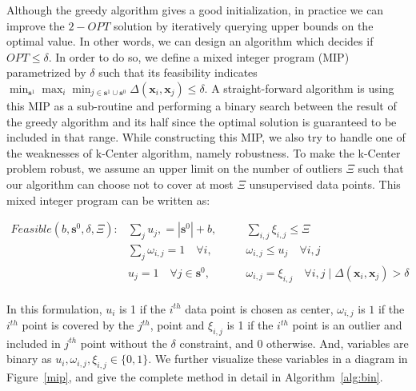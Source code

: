 \documentclass{article}
\begin{document}
Although the greedy algorithm gives a good initialization, in practice we can improve the $2-OPT$ solution by iteratively querying upper bounds on the optimal value. In other words, we can design an algorithm which decides if $OPT \leq \delta$. In order to do so, we define a mixed integer program (MIP) parametrized by $\delta$ such that its feasibility indicates $\min_{\mathbf{s}^1} \max_i \min_{j \in \mathbf{s}^1 \cup \mathbf{s}^0} \Delta(\mathbf{x}_i,\mathbf{x}_j) \leq \delta$. A straight-forward algorithm is using this MIP as a sub-routine and performing a binary search between the result of the greedy algorithm and its half since the optimal solution is guaranteed to be included in that range. While constructing this MIP, we also try to handle one of the weaknesses of k-Center algorithm, namely robustness. To make the k-Center problem robust, we assume an upper limit on the number of outliers $\Xi$ such that our algorithm can choose not to cover at most $\Xi$ unsupervised data points. This mixed integer program can be written as:

\begin{equation}
\begin{aligned}
Feasible(b,\mathbf{s}^0,\delta, \Xi):  &\sum_j  u_j, = |\mathbf{s}^0|+ b,  \quad &&  \sum_{i,j} \xi_{i,j} \leq \Xi \\
&\sum_j \omega_{i,j} = 1\quad \forall  i, \quad && \omega_{i,j} \leq u_j \quad \forall  i,j \\
   & u_j =1 \quad \forall j\in \mathbf{s}^0, \quad && \omega_{i,j} = \xi_{i,j} \quad  \forall i,j \mid   \Delta(\mathbf{x}_i,\mathbf{x}_j)  > \delta\\
\end{aligned}
\label{mipfeasible}
\end{equation}

In this formulation, $u_i$ is 1 if the $i^{th}$ data point is chosen as center, $\omega_{i,j}$ is $1$ if the $i^{th}$ point is covered by the $j^{th}$, point and $\xi_{i,j}$ is 1 if the $i^{th}$ point is an outlier and included in $j^{th}$ point without the $\delta$ constraint, and $0$ otherwise. And, variables are binary as $u_i, \omega_{i,j}, \xi_{i,j} \in \{0,1\}$. We further visualize these variables in a diagram in Figure~\ref{mip}, and give the complete method in detail in Algorithm~\ref{alg:bin}. 
\end{document}
